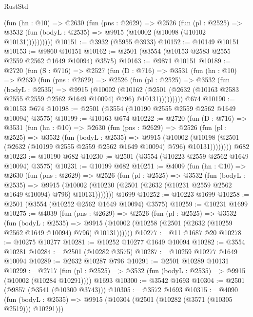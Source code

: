 \begin{lexlean}{RustStd}
\begin{coremodule}
{\begin{coremodule}
{{{{{{{{{{{{{{{{{{{{          (fun (hn : @10) =>
          @2630
            (fun (pns : @2629) =>
            @2526
              (fun (pl : @2525) =>
              @3532 (fun (bodyL : @2535) => @9915 (@10002 (@10098 (@10102 @10131))))))))))
@10151 := @3932 (@5955 @3933)
@10152 := @10149 @10151
@10153 := @9860 @10151
@10162 := @2501 (@3554 (@10153 @2583 @2555 @2559 @2562 @1649 @10094) @3575)
@10163 := @9871 @10151
@10189 := @2720
    (fun (S : @716) =>
    @2527
      (fun (D : @716) =>
      @3531
        (fun (hn : @10) =>
        @2630
          (fun (pns : @2629) =>
          @2526
            (fun (pl : @2525) =>
            @3532
              (fun (bodyL : @2535) =>
              @9915
                (@10002
                  (@10162
                    (@2501
                      (@2632 (@10163 @2583 @2555 @2559 @2562 @1649 @10094) @796)
                      @10131)))))))))
    @674
@10190 := @10153 @674
@10198 := @2501 (@3554 (@10190 @2555 @2559 @2562 @1649 @10094) @3575)
@10199 := @10163 @674
@10222 := @2720
    (fun (D : @716) =>
    @3531
      (fun (hn : @10) =>
      @2630
        (fun (pns : @2629) =>
        @2526
          (fun (pl : @2525) =>
          @3532
            (fun (bodyL : @2535) =>
            @9915
              (@10002
                (@10198 (@2501 (@2632 (@10199 @2555 @2559 @2562 @1649 @10094) @796) @10131))))))))
    @682
@10223 := @10190 @682
@10230 := @2501 (@3554 (@10223 @2559 @2562 @1649 @10094) @3575)
@10231 := @10199 @682
@10251 := @4009
    (fun (hn : @10) =>
    @2630
      (fun (pns : @2629) =>
      @2526
        (fun (pl : @2525) =>
        @3532
          (fun (bodyL : @2535) =>
          @9915 (@10002 (@10230 (@2501 (@2632 (@10231 @2559 @2562 @1649 @10094) @796) @10131)))))))
    @1699
@10252 := @10223 @1699
@10258 := @2501 (@3554 (@10252 @2562 @1649 @10094) @3575)
@10259 := @10231 @1699
@10275 := @4039
    (fun (pns : @2629) =>
    @2526
      (fun (pl : @2525) =>
      @3532
        (fun (bodyL : @2535) =>
        @9915 (@10002 (@10258 (@2501 (@2632 (@10259 @2562 @1649 @10094) @796) @10131))))))
@10277 := @11 @1687 @20
@10278 := @10275 @10277
@10281 := @10252 @10277 @1649 @10094
@10282 := @3554 @10281
@10284 := @2501 (@10282 @3575)
@10287 := @10259 @10277 @1649 @10094
@10289 := @2632 @10287 @796
@10291 := @2501 @10289 @10131
@10299 := @2717
    (fun (pl : @2525) => @3532 (fun (bodyL : @2535) => @9915 (@10002 (@10284 @10291))))
    @1693
@10300 := @3542 @1693
@10304 := @2501 (@9857 (@3541 (@10300 @3743)))
@10305 := @3572 @1693
@10315 := @4090
    (fun (bodyL : @2535) => @9915 (@10304 (@2501 (@10282 (@3571 (@10305 @2519))) @10291)))
}}}}}}}}}}}}}}}}}}}}
\end{coremodule}}
\end{coremodule}
\end{lexlean}
